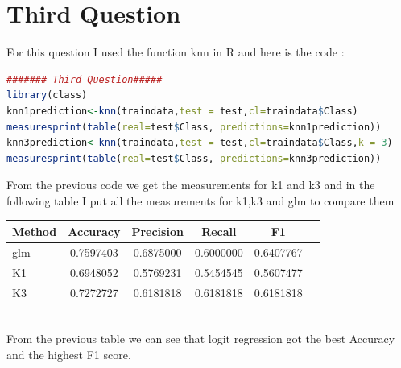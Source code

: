 \documentclass{article}
\begin{document}
\section*{Third Question}
For this question I used the function knn in R and here is the code : 
\begin{lstlisting}[language=R]
####### Third Question#####
library(class)
knn1prediction<-knn(traindata,test = test,cl=traindata$Class)
measuresprint(table(real=test$Class, predictions=knn1prediction))
knn3prediction<-knn(traindata,test = test,cl=traindata$Class,k = 3)
measuresprint(table(real=test$Class, predictions=knn3prediction))
\end{lstlisting}
From the previous code we get the measurements for k1 and k3 and in the following table I put all the measurements for k1,k3 and glm to compare them\\
\begin{tabular}{|l|*{5}{c|}}
\hline
Method&Accuracy&Precision&Recall&F1\\ \hline
glm&0.7597403&0.6875000&0.6000000&0.6407767\\ \hline
K1&0.6948052&0.5769231&0.5454545&0.5607477\\ \hline
K3&0.7272727&0.6181818&0.6181818&0.6181818\\ \hline
\end{tabular}\\
From the previous table we can see that logit regression got the best Accuracy and the highest F1 score.
\end{document}

